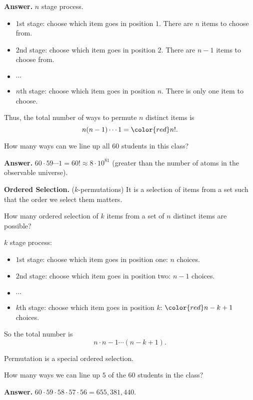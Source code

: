   \textbf{Answer.} $n$ stage process. 
  \begin{itemize}
  \item $1$st stage: choose which item goes in position $1$. There are $n$ items
    to choose from.
  \item $2$nd stage: choose which item goes in position $2$. There are $n-1$
    items to choose from.
  \item $\cdots$
  \item $n$th stage: choose which item goes in position $n$. There
    is only one item to choose.
  \end{itemize}
  Thus, the total number of ways to permute $n$ distinct items is
  \[
    n(n-1)\cdots 1 = {\color{red} n!}.
  \]

  \begin{example}
    How many ways can we line up all $60$ students in this class?
  \end{example}
  \textbf{Answer.} $60\cdot 59\cdots 1 = 60! \approx 8\cdot 10^{81}$ (greater
  than the number of atoms in the observable universe).

  \textbf{Ordered Selection.} ($k$-permutations) It is a selection of items from
  a set such that the order we select them matters.

  How many ordered selection of $k$ items from a set of $n$ distinct items are
  possible?

  $k$ stage process:
  \begin{itemize}
  \item $1$st stage: choose which item goes in position one: $n$ choices.
  \item $2$nd stage: choose which item goes in position two: $n-1$ choices.
  \item $\cdots$
  \item $k$th stage: choose which item goes in position $k$: ${\color{red}
      n-k+1} $ choices.
  \end{itemize}

  So the total number is
  \[
    n\cdot n-1\cdots (n-k+1).
  \]

  \begin{remark}
   Permutation is a special ordered selection. 
  \end{remark}

  \begin{example}
    How many ways we can line up $5$ of the $60$ students in the class?
  \end{example}

  \textbf{Answer.} $60\cdot 59\cdot 58\cdot 57\cdot 56 = 655,381,440$.

